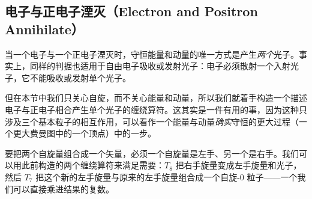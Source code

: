 \subsection{电子与正电子湮灭（Electron and Positron Annihilate）}


当一个电子与一个正电子湮灭时，守恒能量和动量的唯一方式是产生\emph{两个}光子。事实上，同样的判据也适用于自由电子吸收或发射光子：电子必须散射一个入射光子，它不能吸收或发射单个光子。

但在本节中我们只关心自旋，而不关心能量和动量，所以我们就着手构造一个描述电子与正电子相合产生单个光子的缠绕算符。这其实是一件有用的事，因为这种只涉及三个基本粒子的相互作用，可以看作一个能量与动量\emph{确实}守恒的更大过程（一个更大费曼图中的一个顶点）中的一步。

要把两个自旋量组合成一个矢量，必须一个自旋量是左手、另一个是右手。我们可以用此前构造的两个缠绕算符来满足需要：$T_8$ 把右手旋量变成左手旋量和光子，然后 $T_7$ 把这个新的左手旋量与原来的左手旋量组合成一个自旋-0 粒子——一个我们可以直接乘进结果的复数。

